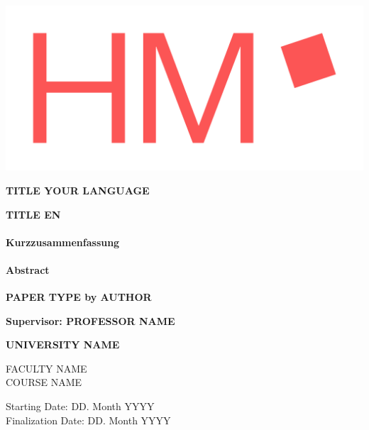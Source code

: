\documentclass[../Main/main.tex]{subfiles}
\begin{document}
\begin{center}
	\vspace{0.4cm}

	\includegraphics[width=\textwidth]{../Media/HM_Logo_RGB.png}

	\Large\textbf{TITLE YOUR LANGUAGE}

	\vspace{0.5cm}
	\large\textbf{TITLE EN}

	\normalsize
	\vspace{0.3cm}
	\begin{multicols}{2}
		\paragraph*{Kurzzusammenfassung}
		
		\columnbreak
		\paragraph*{Abstract}
		

	\end{multicols}

	\vfill
	\textbf{PAPER TYPE by AUTHOR}

	\vspace{0.2cm}
    \textbf{Supervisor: PROFESSOR NAME}

    \vspace{0.4cm}
	\textbf{UNIVERSITY NAME}

	FACULTY NAME\\
	COURSE NAME
	\vspace{0.4cm}

	Starting Date: DD. Month YYYY\\
	Finalization Date: DD. Month YYYY\\
\end{center}

\clearpage
\end{document}
